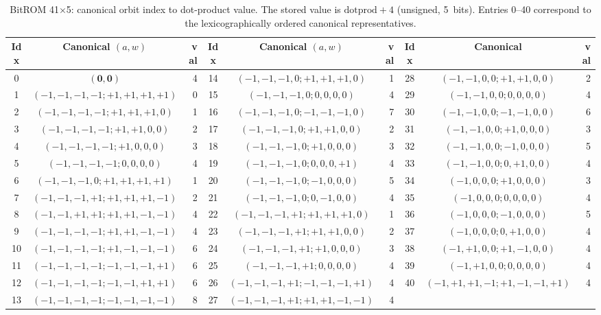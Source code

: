 \begin{table}[ht]
\centering
\small
\caption{BitROM 41$\times$5: canonical orbit index to dot-product value.
         The stored value is \(\mathrm{dotprod}+4\) (unsigned, 5~bits).
         Entries 0--40 correspond to the lexicographically ordered
         canonical representatives.}
\label{tab:bitrom}
\begin{tabular}{ccr||ccr||ccr}
\hline
Idx & Canonical $(a,w)$ & val & Idx & Canonical $(a,w)$ & val & Idx & Canonical & val \\
\hline
0  & $(\mathbf{0},\mathbf{0})$         & 4 &
14 & $(-1,-1,-1,0;+1,+1,+1,0)$         & 1 &
28 & $(-1,-1,0,0;+1,+1,0,0)$           & 2 \\
1  & $(-1,-1,-1,-1;+1,+1,+1,+1)$       & 0 &
15 & $(-1,-1,-1,0;0,0,0,0)$            & 4 &
29 & $(-1,-1,0,0;0,0,0,0)$             & 4 \\
2  & $(-1,-1,-1,-1;+1,+1,+1,0)$        & 1 &
16 & $(-1,-1,-1,0;-1,-1,-1,0)$         & 7 &
30 & $(-1,-1,0,0;-1,-1,0,0)$           & 6 \\
3  & $(-1,-1,-1,-1;+1,+1,0,0)$         & 2 &
17 & $(-1,-1,-1,0;+1,+1,0,0)$          & 2 &
31 & $(-1,-1,0,0;+1,0,0,0)$            & 3 \\
4  & $(-1,-1,-1,-1;+1,0,0,0)$          & 3 &
18 & $(-1,-1,-1,0;+1,0,0,0)$           & 3 &
32 & $(-1,-1,0,0;-1,0,0,0)$            & 5 \\
5  & $(-1,-1,-1,-1;0,0,0,0)$           & 4 &
19 & $(-1,-1,-1,0;0,0,0,+1)$           & 4 &
33 & $(-1,-1,0,0;0,+1,0,0)$            & 4 \\
6  & $(-1,-1,-1,0;+1,+1,+1,+1)$        & 1 &
20 & $(-1,-1,-1,0;-1,0,0,0)$           & 5 &
34 & $(-1,0,0,0;+1,0,0,0)$             & 3 \\
7  & $(-1,-1,-1,+1;+1,+1,+1,-1)$       & 2 &
21 & $(-1,-1,-1,0;0,-1,0,0)$           & 4 &
35 & $(-1,0,0,0;0,0,0,0)$              & 4 \\
8  & $(-1,-1,+1,+1;+1,+1,-1,-1)$       & 4 &
22 & $(-1,-1,-1,+1;+1,+1,+1,0)$        & 1 &
36 & $(-1,0,0,0;-1,0,0,0)$             & 5 \\
9  & $(-1,-1,-1,-1;+1,+1,-1,-1)$       & 4 &
23 & $(-1,-1,-1,+1;+1,+1,0,0)$         & 2 &
37 & $(-1,0,0,0;0,+1,0,0)$             & 4 \\
10 & $(-1,-1,-1,-1;+1,-1,-1,-1)$       & 6 &
24 & $(-1,-1,-1,+1;+1,0,0,0)$          & 3 &
38 & $(-1,+1,0,0;+1,-1,0,0)$           & 4 \\
11 & $(-1,-1,-1,-1;-1,-1,-1,+1)$       & 6 &
25 & $(-1,-1,-1,+1;0,0,0,0)$           & 4 &
39 & $(-1,+1,0,0;0,0,0,0)$             & 4 \\
12 & $(-1,-1,-1,-1;-1,-1,+1,+1)$       & 6 &
26 & $(-1,-1,-1,+1;-1,-1,-1,+1)$       & 4 &
40 & $(-1,+1,+1,-1;+1,-1,-1,+1)$       & 4 \\
13 & $(-1,-1,-1,-1;-1,-1,-1,-1)$       & 8 &
27 & $(-1,-1,-1,+1;+1,+1,-1,-1)$       & 4 &   &   & \\
\hline
\end{tabular}
\end{table}

